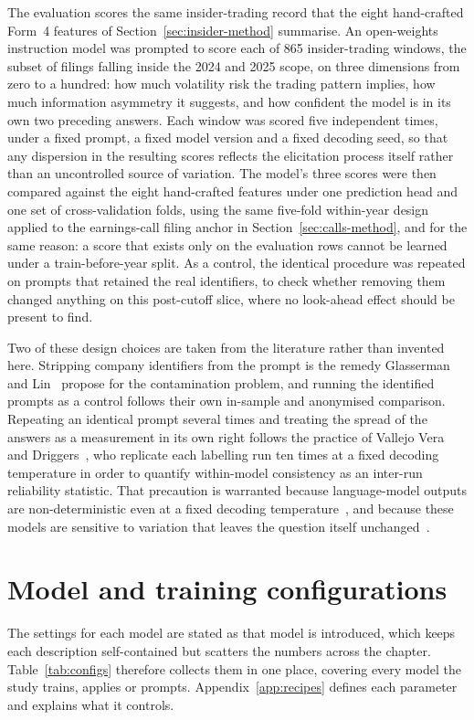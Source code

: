 \documentclass[logo,msc,ai]{infthesis}        %
\begin{document}
The evaluation scores the same insider-trading record that the eight hand-crafted Form~4 features of Section~\ref{sec:insider-method} summarise. An open-weights instruction model was prompted to score each of 865 insider-trading windows, the subset of filings falling inside the 2024 and 2025 scope, on three dimensions from zero to a hundred: how much volatility risk the trading pattern implies, how much information asymmetry it suggests, and how confident the model is in its own two preceding answers. Each window was scored five independent times, under a fixed prompt, a fixed model version and a fixed decoding seed, so that any dispersion in the resulting scores reflects the elicitation process itself rather than an uncontrolled source of variation. The model's three scores were then compared against the eight hand-crafted features under one prediction head and one set of cross-validation folds, using the same five-fold within-year design applied to the earnings-call filing anchor in Section~\ref{sec:calls-method}, and for the same reason: a score that exists only on the evaluation rows cannot be learned under a train-before-year split. As a control, the identical procedure was repeated on prompts that retained the real identifiers, to check whether removing them changed anything on this post-cutoff slice, where no look-ahead effect should be present to find.

Two of these design choices are taken from the literature rather than invented here. Stripping company identifiers from the prompt is the remedy Glasserman and Lin~\cite{glasserman2024lookahead} propose for the contamination problem, and running the identified prompts as a control follows their own in-sample and anonymised comparison. Repeating an identical prompt several times and treating the spread of the answers as a measurement in its own right follows the practice of Vallejo Vera and Driggers~\cite{vallejo2025llms}, who replicate each labelling run ten times at a fixed decoding temperature in order to quantify within-model consistency as an inter-run reliability statistic. That precaution is warranted because language-model outputs are non-deterministic even at a fixed decoding temperature~\cite{ouyang2025empirical}, and because these models are sensitive to variation that leaves the question itself unchanged~\cite{sclar2024quantifying}.

\section{Model and training configurations}
\label{sec:configs}
The settings for each model are stated as that model is introduced, which keeps each description self-contained but scatters the numbers across the chapter. Table~\ref{tab:configs} therefore collects them in one place, covering every model the study trains, applies or prompts. Appendix~\ref{app:recipes} defines each parameter and explains what it controls.
\end{document}
